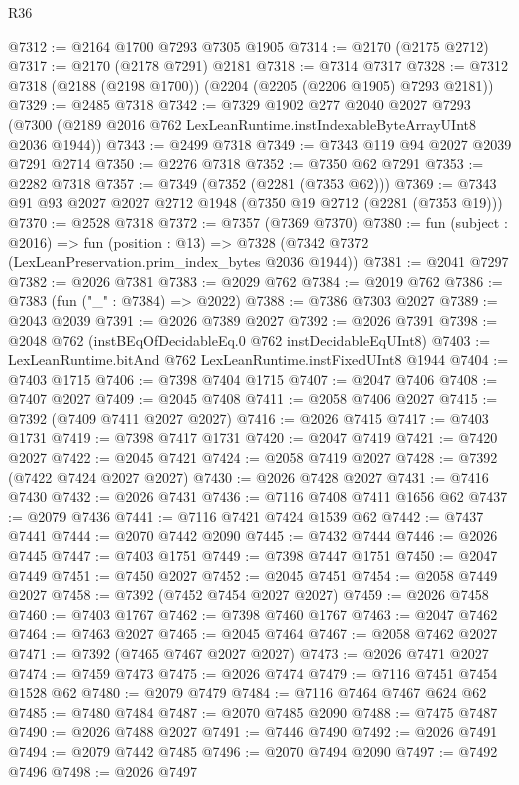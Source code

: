 \begin{lexlean}{R36}
\begin{coremodule}
@7312 := @2164 @1700 @7293 @7305 @1905
@7314 := @2170 (@2175 @2712)
@7317 := @2170 (@2178 @7291) @2181
@7318 := @7314 @7317
@7328 := @7312 @7318 (@2188 (@2198 @1700)) (@2204 (@2205 (@2206 @1905) @7293 @2181))
@7329 := @2485 @7318
@7342 := @7329
    @1902
    @277
    @2040
    @2027
    @7293
    (@7300 (@2189 @2016 @762 LexLeanRuntime.instIndexableByteArrayUInt8 @2036 @1944))
@7343 := @2499 @7318
@7349 := @7343 @119 @94 @2027 @2039 @7291 @2714
@7350 := @2276 @7318
@7352 := @7350 @62 @7291
@7353 := @2282 @7318
@7357 := @7349 (@7352 (@2281 (@7353 @62)))
@7369 := @7343 @91 @93 @2027 @2027 @2712 @1948 (@7350 @19 @2712 (@2281 (@7353 @19)))
@7370 := @2528 @7318
@7372 := @7357 (@7369 @7370)
@7380 := fun (subject : @2016) =>
  fun (position : @13) => @7328 (@7342 @7372 (LexLeanPreservation.prim_index_bytes @2036 @1944))
@7381 := @2041 @7297
@7382 := @2026 @7381
@7383 := @2029 @762
@7384 := @2019 @762
@7386 := @7383 (fun ("_" : @7384) => @2022)
@7388 := @7386 @7303 @2027
@7389 := @2043 @2039
@7391 := @2026 @7389 @2027
@7392 := @2026 @7391
@7398 := @2048 @762 (instBEqOfDecidableEq.{0} @762 instDecidableEqUInt8)
@7403 := LexLeanRuntime.bitAnd @762 LexLeanRuntime.instFixedUInt8 @1944
@7404 := @7403 @1715
@7406 := @7398 @7404 @1715
@7407 := @2047 @7406
@7408 := @7407 @2027
@7409 := @2045 @7408
@7411 := @2058 @7406 @2027
@7415 := @7392 (@7409 @7411 @2027 @2027)
@7416 := @2026 @7415
@7417 := @7403 @1731
@7419 := @7398 @7417 @1731
@7420 := @2047 @7419
@7421 := @7420 @2027
@7422 := @2045 @7421
@7424 := @2058 @7419 @2027
@7428 := @7392 (@7422 @7424 @2027 @2027)
@7430 := @2026 @7428 @2027
@7431 := @7416 @7430
@7432 := @2026 @7431
@7436 := @7116 @7408 @7411 @1656 @62
@7437 := @2079 @7436
@7441 := @7116 @7421 @7424 @1539 @62
@7442 := @7437 @7441
@7444 := @2070 @7442 @2090
@7445 := @7432 @7444
@7446 := @2026 @7445
@7447 := @7403 @1751
@7449 := @7398 @7447 @1751
@7450 := @2047 @7449
@7451 := @7450 @2027
@7452 := @2045 @7451
@7454 := @2058 @7449 @2027
@7458 := @7392 (@7452 @7454 @2027 @2027)
@7459 := @2026 @7458
@7460 := @7403 @1767
@7462 := @7398 @7460 @1767
@7463 := @2047 @7462
@7464 := @7463 @2027
@7465 := @2045 @7464
@7467 := @2058 @7462 @2027
@7471 := @7392 (@7465 @7467 @2027 @2027)
@7473 := @2026 @7471 @2027
@7474 := @7459 @7473
@7475 := @2026 @7474
@7479 := @7116 @7451 @7454 @1528 @62
@7480 := @2079 @7479
@7484 := @7116 @7464 @7467 @624 @62
@7485 := @7480 @7484
@7487 := @2070 @7485 @2090
@7488 := @7475 @7487
@7490 := @2026 @7488 @2027
@7491 := @7446 @7490
@7492 := @2026 @7491
@7494 := @2079 @7442 @7485
@7496 := @2070 @7494 @2090
@7497 := @7492 @7496
@7498 := @2026 @7497

\end{coremodule}
\end{lexlean}

